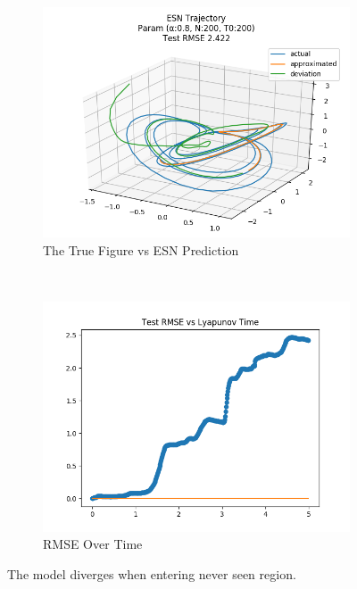 \documentclass{article}
\begin{document}
\begin{figure}[H]
    \centering
    \begin{subfigure}[b]{0.45\textwidth}
        \includegraphics[width=\textwidth]{doc/paper/images/lorenz/rank_0_param_225_fit.png}
        \caption{The True Figure vs ESN Prediction}
        \label{fig:lorenz_r0_fit}
    \end{subfigure}
    ~
    \begin{subfigure}[b]{0.45\textwidth}
        \includegraphics[width=\textwidth]{doc/paper/images/lorenz/rank_0_param_225_rmse.png}
        \caption{RMSE Over Time}
        \label{fig:lorenz_r0_rmse}
    \end{subfigure}
    \caption{The model diverges when entering never seen region.}
    \label{fig:lorenz_r0}
\end{figure}
\end{document}
